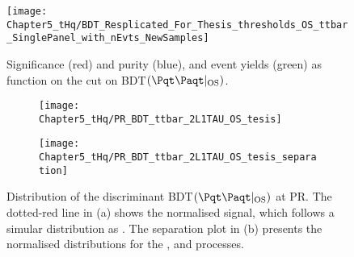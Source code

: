 \begin{figure}[h]
\centering
  \texttt{[image: Chapter5\_tHq/BDT\_Resplicated\_For\_Thesis\_thresholds\_OS\_ttbar\_SinglePanel\_with\_nEvts\_NewSamples]}
\caption{Significance (red) and \ttbar purity (blue), and \ttbar event yields (green) as function on the cut on BDT$(\ttbar|_{\text{OS}})$.}
\label{fig:ChaptH:EventSelection:CR_OS:Significance}
\end{figure}


\begin{figure}[h]
\centering
\begin{subfigure}{.45\textwidth}
  \centering
  \texttt{[image: Chapter5\_tHq/PR\_BDT\_ttbar\_2L1TAU\_OS\_tesis]}
  \caption{}
\end{subfigure}%
\begin{subfigure}{.5 \textwidth}
  \centering
  \texttt{[image: Chapter5\_tHq/PR\_BDT\_ttbar\_2L1TAU\_OS\_tesis\_separation]}
  \caption{}
\end{subfigure}
\caption{Distribution of the discriminant BDT$(\ttbar|_{\text{OS}})$ at PR.
The dotted-red line in (a) shows the normalised \tHq signal, which follows a simular 
distribution as \ttbar. The separation plot in (b) presents the normalised distributions 
for the \tHq, \ttbar and \Zjets processes.}
\label{fig:ChaptH:EventSelection:SR:OS:BDT_tt_score_distribution}
\end{figure}


